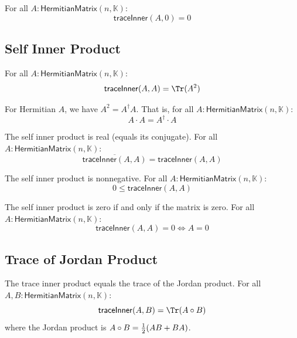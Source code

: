 \begin{theorem}
For all $A : \mathsf{HermitianMatrix}(n, \mathbb{K})$:
\[ \mathsf{traceInner}(A, 0) = 0 \]
\end{theorem}

\subsection{Self Inner Product}

\begin{theorem}
For all $A : \mathsf{HermitianMatrix}(n, \mathbb{K})$:
\[ \mathsf{traceInner}(A, A) = \Tr(A^2) \]
\end{theorem}

\begin{theorem}
For Hermitian $A$, we have $A^2 = A^\dagger A$. That is, for all $A : \mathsf{HermitianMatrix}(n, \mathbb{K})$:
\[ A \cdot A = A^\dagger \cdot A \]
\end{theorem}

\begin{theorem}
The self inner product is real (equals its conjugate). For all $A : \mathsf{HermitianMatrix}(n, \mathbb{K})$:
\[ \overline{\mathsf{traceInner}(A, A)} = \mathsf{traceInner}(A, A) \]
\end{theorem}

\begin{theorem}
The self inner product is nonnegative. For all $A : \mathsf{HermitianMatrix}(n, \mathbb{K})$:
\[ 0 \le \mathsf{traceInner}(A, A) \]
\end{theorem}

\begin{theorem}
The self inner product is zero if and only if the matrix is zero. For all $A : \mathsf{HermitianMatrix}(n, \mathbb{K})$:
\[ \mathsf{traceInner}(A, A) = 0 \iff A = 0 \]
\end{theorem}

\subsection{Trace of Jordan Product}

\begin{theorem}
The trace inner product equals the trace of the Jordan product. For all $A, B : \mathsf{HermitianMatrix}(n, \mathbb{K})$:
\[ \mathsf{traceInner}(A, B) = \Tr(A \jmul B) \]
where the Jordan product is $A \circ B = \frac{1}{2}(AB + BA)$.
\end{theorem}

